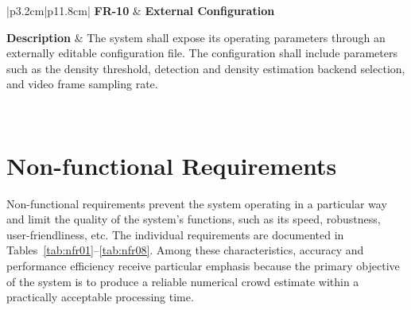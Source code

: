 
\begin{table}[H]
	\centering
	\renewcommand{\arraystretch}{1.25}
	\begin{tabular}{|p{3.2cm}|p{11.8cm}|}
		\hline
		\textbf{FR-10} &
		\textbf{External Configuration} \\ \hline
		
		\textbf{Description} &
		The system shall expose its operating parameters through an externally editable configuration file. The configuration shall include parameters such as the density threshold, detection and density estimation backend selection, and video frame sampling rate. \\ \hline
		
		 \\ \hline
	\end{tabular}
	\caption{Functional requirement for external system configuration.}
	\label{tab:fr10}
\end{table}

\section{Non-functional Requirements}
\label{sec:nfr}

Non-functional requirements prevent the system operating in a particular way and limit the quality of the system's functions, such as its speed, robustness, user-friendliness, etc. The individual requirements are documented in Tables~\ref{tab:nfr01}--\ref{tab:nfr08}. Among these characteristics, accuracy and performance efficiency receive particular emphasis because the primary objective of the system is to produce a reliable numerical crowd estimate within a practically acceptable processing time.


